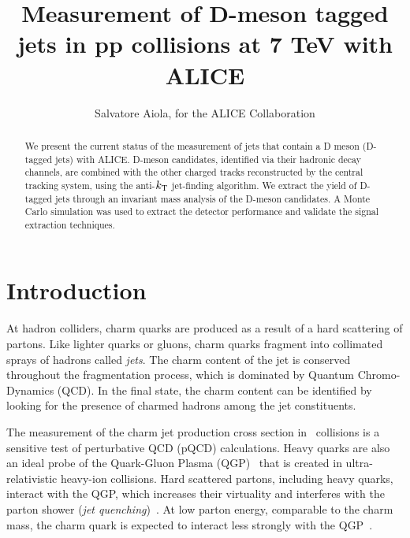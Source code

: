 \documentclass[a4paper]{jpconf}
\begin{document}
\title{Measurement of D-meson tagged jets in pp collisions at 7 TeV with ALICE}

\author{Salvatore Aiola, for the ALICE Collaboration}

\address{Physics Department, Yale University, 266 Whitney Avenue, New Haven, CT 06511}


\begin{abstract}
We present the current status of the measurement of jets that contain a D meson (D-tagged jets) with \mbox{ALICE}.
D-meson candidates, identified via their hadronic decay channels, are combined with the other charged tracks reconstructed by the central tracking system, 
using the anti-$k_{\rm T}$ jet-finding algorithm.
We extract the yield of D-tagged jets through an invariant mass analysis of the D-meson candidates.
A Monte Carlo simulation was used to extract the detector performance and validate the signal extraction techniques.
\end{abstract}

\section{Introduction}
At hadron colliders, charm quarks are produced as a result of a hard scattering of partons. Like lighter quarks or gluons, charm quarks
fragment into collimated sprays of hadrons called \emph{jets}. The charm content of the jet is conserved throughout the fragmentation process,
which is dominated by Quantum Chromo-Dynamics (QCD).
In the final state, the charm content can be identified by looking for the presence of charmed hadrons among the jet constituents.

The measurement of the charm jet production cross section in \pp\ collisions is a sensitive test of perturbative QCD (pQCD) calculations.
Heavy quarks are also an ideal probe of the Quark-Gluon Plasma (QGP)~\cite{STAR:2005a, PHENIX:2005a}
that is created in ultra-relativistic heavy-ion collisions. 
Hard scattered partons, including heavy quarks, interact with the QGP, which increases their virtuality and interferes with the
parton shower (\emph{jet quenching})~\cite{PHENIX:2008b, CMS:2012b, ALICE:2015a}.
At low parton energy, comparable to the charm mass, the charm quark is expected
to interact less strongly with the QGP~\cite{Dokshitzer:2001}.
\end{document}
